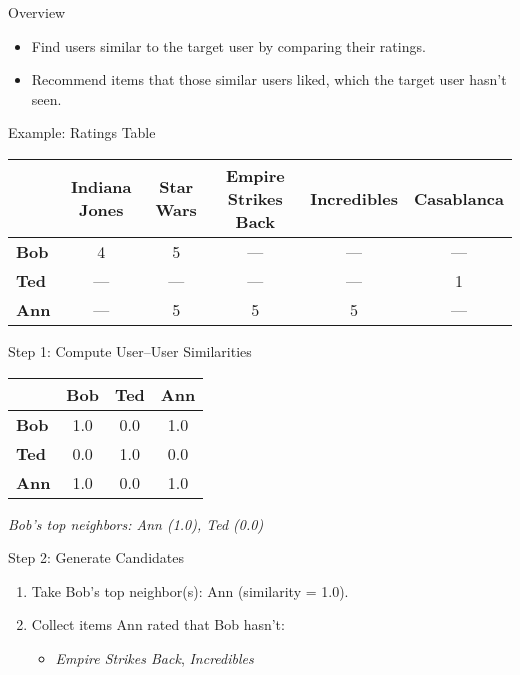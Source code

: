 \documentclass{beamer}
\begin{document}
\begin{frame}{Overview}
\begin{itemize}
  \item Find users similar to the target user by comparing their ratings.
  \item Recommend items that those similar users liked, which the target user hasn't seen.
\end{itemize}
\end{frame}

\begin{frame}{Example: Ratings Table}
\scriptsize
\begin{tabular}{l|ccccc}
                & Indiana Jones & Star Wars & Empire Strikes Back & Incredibles & Casablanca \\ \hline
\textbf{Bob}    & 4             & 5         & —                   & —           & —          \\
\textbf{Ted}    & —             & —         & —                   & —           & 1          \\
\textbf{Ann}    & —             & 5         & 5                   & 5           & —          \\
\end{tabular}
\end{frame}

\begin{frame}{Step 1: Compute User–User Similarities}
\centering\scriptsize
\begin{tabular}{l|ccc}
       & \textbf{Bob} & \textbf{Ted} & \textbf{Ann} \\ \hline
\textbf{Bob} & 1.0          & 0.0          & 1.0          \\
\textbf{Ted} & 0.0          & 1.0          & 0.0          \\
\textbf{Ann} & 1.0          & 0.0          & 1.0          \\
\end{tabular}

\vspace{1em}
\emph{Bob’s top neighbors: Ann (1.0), Ted (0.0)}
\end{frame}

\begin{frame}{Step 2: Generate Candidates}
\begin{enumerate}
  \item Take Bob’s top neighbor(s): Ann (similarity = 1.0).
  \item Collect items Ann rated that Bob hasn’t:
    \begin{itemize}
      \item \textit{Empire Strikes Back}, \textit{Incredibles}
    \end{itemize}
\end{enumerate}
\end{frame}
\end{document}
